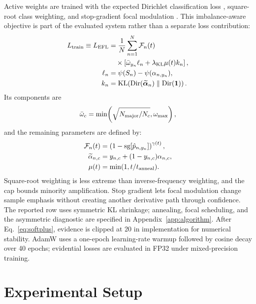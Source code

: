 \documentclass[letterpaper]{article}
\newcommand{\sg}{\mathrm{sg}}                %
\newcommand{\Dir}{\text{Dir}}
\newcommand{\KL}{\text{KL}}
\begin{document}
Active weights are trained with the expected Dirichlet classification loss \cite{sensoy2018evidential}, square-root class weighting, and stop-gradient focal modulation \cite{lin2017focal}. This imbalance-aware objective is part of the evaluated system rather than a separate loss contribution:
\begin{equation}\label{eq:efl}
\begin{aligned}
    L_{\rm train}\equiv L_{\rm EFL}
    &=\frac{1}{N}\sum_{n=1}^N\mathcal F_n(t)\\
    &\quad\times\left[
    \bar\omega_{y_n}\ell_n
    +\lambda_{\mathrm{KL}}\mu(t)k_n\right],\\
    \ell_n&=\psi(S_n)-\psi(\alpha_{n,y_n}),\\
    k_n&=\KL\!\left(
    \Dir(\widetilde{\bm\alpha}_n)\parallel\Dir(\mathbf1)\right).
\end{aligned}
\end{equation}
Its components are
\begin{equation}\label{eq:sample_weight}
\bar\omega_c=\min\!\left(
\sqrt{N_{\rm major}/N_c},\omega_{\max}\right),
\end{equation}
and the remaining parameters are defined by:
\begin{equation}\label{eq:kl_loss_main}
\begin{aligned}
\mathcal F_n(t)&=\left(1-\sg[\hat p_{n,y_n}]\right)^{\gamma(t)},\\
\widetilde\alpha_{n,c}&=y_{n,c}+(1-y_{n,c})\alpha_{n,c},\\
\mu(t)&=\min(1,t/t_{\rm anneal}).
\end{aligned}
\end{equation}
Square-root weighting is less extreme than inverse-frequency weighting, and the cap bounds minority amplification. Stop gradient lets focal modulation change sample emphasis without creating another derivative path through confidence. The reported row uses symmetric KL shrinkage; annealing, focal scheduling, and the asymmetric diagnostic are specified in Appendix~\ref{app:algorithm}. After Eq.~\ref{eq:softplus}, evidence is clipped at 20 in implementation for numerical stability. AdamW uses a one-epoch learning-rate warmup followed by cosine decay over 40 epochs; evidential losses are evaluated in FP32 under mixed-precision training.

\section{Experimental Setup}\label{sec:experiment}
\end{document}
